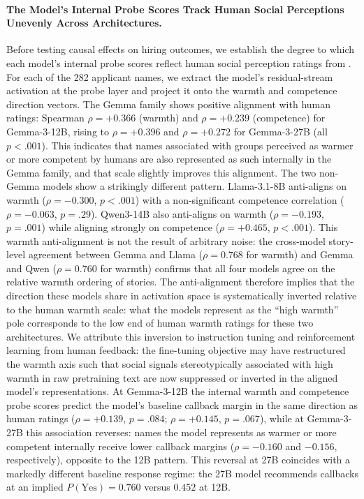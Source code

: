 \documentclass[twocolumn]{article}
\begin{document}
\paragraph{The Model's Internal Probe Scores Track Human Social Perceptions
Unevenly Across Architectures.}
Before testing causal effects on hiring outcomes, we establish the degree
to which each model's internal probe scores reflect human social
perception ratings from \citet{gallo2024warmth}.
For each of the 282 applicant names, we extract the model's
residual-stream activation at the probe layer and project it onto the
warmth and competence direction vectors.
The Gemma family shows positive alignment with human ratings: Spearman
$\rho = +0.366$ (warmth) and $\rho = +0.239$ (competence) for
Gemma-3-12B, rising to $\rho = +0.396$ and $\rho = +0.272$ for
Gemma-3-27B (all $p < .001$).
This indicates that names associated with groups perceived as warmer or
more competent by humans are also represented as such internally in the
Gemma family, and that scale slightly improves this alignment.
The two non-Gemma models show a strikingly different pattern.
Llama-3.1-8B anti-aligns on warmth ($\rho = -0.300$, $p < .001$) with
a non-significant competence correlation ($\rho = -0.063$, $p = .29$).
Qwen3-14B also anti-aligns on warmth ($\rho = -0.193$, $p = .001$) while
aligning strongly on competence ($\rho = +0.465$, $p < .001$).
This warmth anti-alignment is not the result of arbitrary noise: the
cross-model story-level agreement between Gemma and Llama ($\rho = 0.768$
for warmth) and Gemma and Qwen ($\rho = 0.760$ for warmth) confirms that
all four models agree on the relative warmth ordering of stories.
The anti-alignment therefore implies that the direction these models share
in activation space is systematically inverted relative to the human
warmth scale: what the models represent as the ``high warmth'' pole
corresponds to the low end of human warmth ratings for these two
architectures.
We attribute this inversion to instruction tuning and reinforcement
learning from human feedback: the fine-tuning objective may have
restructured the warmth axis such that social signals stereotypically
associated with high warmth in raw pretraining text are now suppressed or
inverted in the aligned model's representations.
At Gemma-3-12B the internal warmth and competence probe scores predict
the model's baseline callback margin in the same direction as human
ratings ($\rho = +0.139$, $p = .084$; $\rho = +0.145$, $p = .067$),
while at Gemma-3-27B this association reverses: names the model
represents as warmer or more competent internally receive lower callback
margins ($\rho = -0.160$ and $-0.156$, respectively), opposite to the
12B pattern.
This reversal at 27B coincides with a markedly different baseline
response regime: the 27B model recommends callbacks at an implied
$P(\text{Yes}) = 0.760$ versus $0.452$ at 12B.
\end{document}
